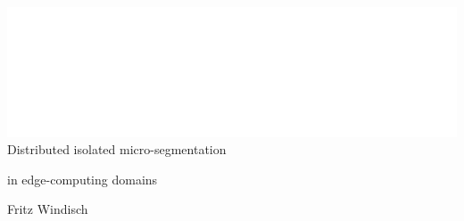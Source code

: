 \documentclass{article}
\begin{document}
\hspace{280mm} \includegraphics[]{tud.png} \\[3mm]

\hline
\vspace{10mm}
\hspace{280mm} %
\Huge Distributed isolated micro-segmentation


\hspace{280mm}
\Huge in edge-computing domains

\vspace{20mm}
\hspace{280mm}
\LARGE Fritz Windisch
\end{document}
